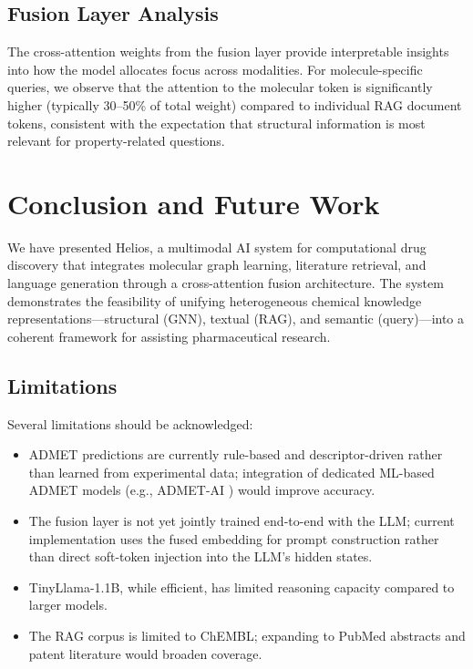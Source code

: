 \documentclass[conference]{IEEEtran}
\begin{document}
\subsection{Fusion Layer Analysis}

The cross-attention weights from the fusion layer provide interpretable insights into how the model allocates focus across modalities. For molecule-specific queries, we observe that the attention to the molecular token is significantly higher (typically 30--50\% of total weight) compared to individual RAG document tokens, consistent with the expectation that structural information is most relevant for property-related questions.

\section{Conclusion and Future Work}
\label{sec:conclusion}

We have presented Helios, a multimodal AI system for computational drug discovery that integrates molecular graph learning, literature retrieval, and language generation through a cross-attention fusion architecture. The system demonstrates the feasibility of unifying heterogeneous chemical knowledge representations---structural (GNN), textual (RAG), and semantic (query)---into a coherent framework for assisting pharmaceutical research.

\subsection{Limitations}

Several limitations should be acknowledged:
\begin{itemize}
    \item ADMET predictions are currently rule-based and descriptor-driven rather than learned from experimental data; integration of dedicated ML-based ADMET models (e.g., ADMET-AI \cite{swanson2024admetai}) would improve accuracy.
    \item The fusion layer is not yet jointly trained end-to-end with the LLM; current implementation uses the fused embedding for prompt construction rather than direct soft-token injection into the LLM's hidden states.
    \item TinyLlama-1.1B, while efficient, has limited reasoning capacity compared to larger models.
    \item The RAG corpus is limited to ChEMBL; expanding to PubMed abstracts and patent literature would broaden coverage.
\end{itemize}
\end{document}
